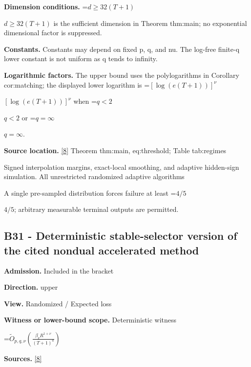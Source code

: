 \documentclass[10pt,a4paper]{article}
\newcommand{\AtlasMath}[1]{\par\begingroup\centering\setbox0=\hbox{$\displaystyle #1$}\ifdim\wd0>1.4\linewidth\typeout{ATLAS WIDE FORMULA: \the\wd0}\fi\ifdim\wd0>\linewidth\resizebox{\linewidth}{!}{\box0}\else\box0\fi\par\endgroup}
\newcommand{\AtlasInlineMath}[1]{\begingroup\setbox0=\hbox{$#1$}\ifdim\wd0>.4\linewidth\endgroup\AtlasMath{#1}\else\endgroup$#1$\fi}
\begin{document}
\textbf{Dimension conditions.} \AtlasInlineMath{d\ge32(T+1)} is the sufficient dimension in Theorem thm:main; no exponential dimensional factor is suppressed.



\textbf{Constants.} Constants may depend on fixed p, q, and nu. The log-free finite-q lower constant is not uniform as q tends to infinity.



\textbf{Logarithmic factors.} The upper bound uses the polylogarithms in Corollary cor:matching; the displayed lower logarithm is \AtlasInlineMath{[\log(e(T+1))]^\nu} when \AtlasInlineMath{q<2} or \AtlasInlineMath{q=\infty}.



\textbf{Source location.} \href{https://github.com/WU-Wendao/Colombo/blob/main/colombo_sensorium/Complexity_altas/data/sources/colombo/B1/manuscript.pdf}{[8]} Theorem thm:main, eq:threshold; Table tab:regimes



Signed interpolation margins, exact-local smoothing, and adaptive hidden-sign simulation. All unrestricted randomized adaptive algorithms



A single pre-sampled distribution forces failure at least \AtlasInlineMath{4/5}; arbitrary measurable terminal outputs are permitted.



\subsection{B31 - Deterministic stable-selector version of the cited nondual accelerated method}


\textbf{Admission.} Included in the bracket



\textbf{Direction.} upper



\textbf{View.} Randomized / Expected loss



\textbf{Witness or lower-bound scope.} Deterministic witness



\AtlasMath{\widetilde O_{p,q,\nu}\!\left(\frac{\beta_\nu R^{1+\nu}}{(T+1)^a}\right)}


\textbf{Sources.} \href{https://github.com/WU-Wendao/Colombo/blob/main/colombo_sensorium/Complexity_altas/data/sources/colombo/B1/manuscript.pdf}{[8]}
\end{document}
